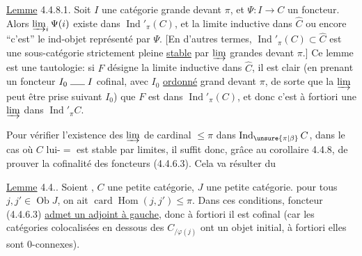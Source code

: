 \uline{Lemme} 4.4.8.1. Soit $I$ une catégorie grande devant $\pi$, et $\Psi:I\longrightarrow C$ un foncteur. Alors $\varinjlim_i\Psi(i)$ existe dans $\operatorname{Ind}'_{\pi}(C)$, et   la limite inductive dans $\widehat C$  ou encore ``c'est'' le ind-objet  représenté par $\Psi$. [En d'autres termes, $\operatorname{Ind}'_{\pi}(C)\subset\widehat C$ est une sous-catégorie strictement pleine \uline{stable} par $\varinjlim$ grandes devant $\pi$.]
Ce lemme est une tautologie: si $F$ désigne la limite inductive dans $\widehat C$, il est clair  (en prenant un foncteur $I_0\mathrel{\rule{1.5em}{0.4pt}}I$ cofinal, avec $I_0$ \uline{ordonné} grand devant $\pi$, de sorte que la $\varinjlim$ peut être prise suivant $I_0$) que $F$ est dans $\operatorname{Ind}'_{\pi}(C)$, et donc c'est à fortiori une $\varinjlim$ dans $\operatorname{Ind}'_{\pi}C$.

Pour vérifier l'existence des $\varinjlim$ de cardinal $\leq\pi$ dans $\operatorname{Ind}_{\unsure{\pi|\beta}}C$, dans le cas où $C$ lui-$=$ est stable par  limites, il suffit donc, grâce au corollaire 4.4.8, de prouver la cofinalité des foncteurs (4.4.6.3). Cela va résulter du 

\uline{Lemme} 4.4.. Soient \deleted{\unsure{$\pi$}},  $C$ une petite catégorie, $J$ une petite catégorie.    pour tous $j,j'\in\operatorname{Ob}J$, on ait $\operatorname{card}\operatorname{Hom}(j,j')\leq\pi$.  Dans ces conditions,    foncteur (4.4.6.3)  \uline{admet un adjoint à gauche}, donc à fortiori il est cofinal (car les catégories colocalisées en dessous des $C_{/\varphi(j)}$ ont un objet initial, à fortiori elles sont $0$-connexes).

